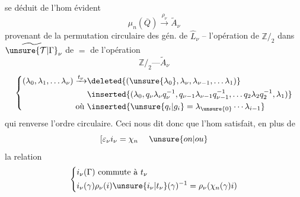 se déduit de l'hom évident
\[
\mu_n(\overline Q)\xrightarrow{\rho_\nu}\widetilde A_\nu
\]
provenant de la permutation circulaire des
gén. de $\widehat L_\nu$ -- l'opération de
$\mathbb Z/_{2}$ dans $\widetilde{\unsure{\mathcal T|\Gamma}}_\nu$  de $=$ de
l'opération
\[
\mathbb Z/_{2}\text{---}\widetilde A_\nu
\]
\[
\left\{\begin{aligned}
(\lambda_0,\lambda_1,\ldots\lambda_\nu)\xrightarrow{t_\nu}&\deleted{(\unsure{\lambda_0},\lambda_\nu,\lambda_{\nu-1},\ldots\lambda_1)}\\
&\inserted{(\lambda_0,q_\nu\lambda_\nu q_\nu^{-1},q_{\nu-1}\lambda_{\nu-1}q_{\nu-1}^{-1},\ldots q_2\lambda_2q_2^{-1},\lambda_1)}\\
\text{où }&\inserted{\unsure{q_i|g_i}=\lambda_{\unsure{0}}\cdots\lambda_{i-1}}
\end{aligned}\right.
\]
qui renverse l'ordre circulaire.
Ceci nous dit donc que l'hom
satisfait, en plus de
\[
\left[\varepsilon_\nu i_\nu=\chi_n\right.\quad\unsure{on|ou}
\]
la relation
\[
\left\{\begin{aligned}
&i_\nu(\Gamma)\text{ commute à }t_\nu\\
&i_\nu(\gamma)\rho_\nu(i)\unsure{i_\nu|t_\nu}(\gamma)^{-1}=\rho_\nu(\chi_n(\gamma)i)
\end{aligned}\right.
\]

